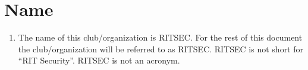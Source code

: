 
\section{Name}

\begin{enumerate}
  \item The name of this club/organization is RITSEC. For the rest of this
    document the club/organization will be referred to as RITSEC. RITSEC is not
    short for “RIT Security”. RITSEC is not an acronym.
\end{enumerate}